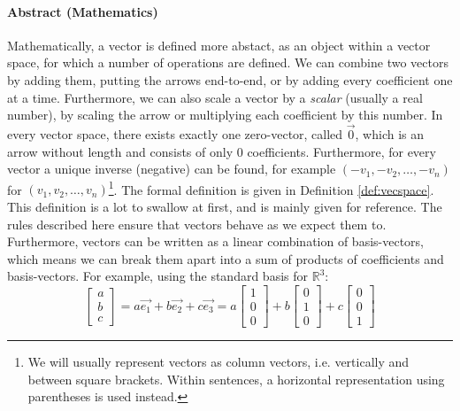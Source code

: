 \paragraph{Abstract (Mathematics)}
Mathematically, a vector is defined more abstact, as an object within a vector space, for which a number of operations are defined. We can combine two vectors by adding them, putting the arrows end-to-end, or by adding every coefficient one at a time. Furthermore, we can also scale a vector by a \emph{scalar} (usually a real number), by scaling the arrow or multiplying each coefficient by this number. In every vector space, there exists exactly one zero-vector, called $\vec 0$, which is an arrow without length and consists of only $0$ coefficients. Furthermore, for every vector a unique inverse (negative) can be found, for example $(-v_1, -v_2, \dots, -v_n)$ for $(v_1, v_2, \dots, v_n)$\footnote{We will usually represent vectors as column vectors, i.e. vertically and between square brackets. Within sentences, a horizontal representation using parentheses is used instead.}. The formal definition is given in Definition \ref{def:vecspace}. This definition is a lot to swallow at first, and is mainly given for reference. The rules described here ensure that vectors behave as we expect them to. Furthermore, vectors can be written as a linear combination of basis-vectors, which means we can break them apart into a sum of products of coefficients and basis-vectors. For example, using the standard basis for $\mathbb{R}^3$:
$$ \begin{bmatrix}a \\ b \\ c\end{bmatrix} = a\vec{e_1} + b\vec{e_2} + c\vec{e_3} = a \begin{bmatrix}1 \\ 0 \\ 0\end{bmatrix} + b \begin{bmatrix}0 \\ 1 \\ 0\end{bmatrix} + c \begin{bmatrix} 0 \\ 0 \\ 1 \end{bmatrix}$$

